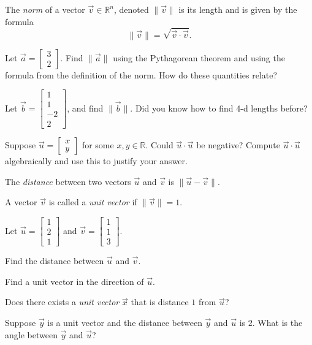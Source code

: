 \documentclass{problemset}
\newcommand{\R}{\mathbb{R}}
\newcommand{\mat}[1]{\begin{bmatrix}#1\end{bmatrix}}
\begin{document}
	\begin{definition}[Norm]
		The \emph{norm} of a vector $\vec v\in\R^n$, denoted $\|\vec v\|$ is its length
		and is given by the formula
		\[
			\|\vec v\| = \sqrt{\vec v\cdot\vec v}.
		\]
	\end{definition}

	\question
	\begin{parts}
		\item Let $\vec a = \mat{3\\2}$.  Find $\|\vec a\|$ using the Pythagorean theorem
			and using the formula from the definition of the norm.  How do
			these quantities relate?
		\item Let $\vec b = \mat{1\\1\\-2\\2}$, and find $\|\vec b\|$.
		Did you know how to find 4-d lengths before?
	
		\item Suppose $\vec u=\mat{x\\ y}$ for some $x,y\in \R$.
		Could $\vec u\cdot \vec u$ be negative? Compute $\vec u\cdot \vec u$ algebraically
		and use this to justify your answer.
	\end{parts}

	\begin{definition}[Distance]
		The \emph{distance} between two vectors $\vec u$ and $\vec v$ is $\|\vec u-\vec v\|$.
	\end{definition}
	\begin{definition}
		A vector $\vec v$ is called a \emph{unit vector} if $\|\vec v\|=1$.
	\end{definition}
	
	\question
	Let $\vec u=\mat{1\\2\\1}$ and $\vec v=\mat{1\\1\\3}$.
	\begin{parts}
		\item Find the distance between $\vec u$ and $\vec v$.
		\item Find a unit vector in the direction of $\vec u$.
		\item Does there exists a \emph{unit vector} $\vec x$ that is distance
			$1$ from $\vec u$?
		\item Suppose $\vec y$ is a unit vector and the distance between $\vec y$ and
			$\vec u$ is $2$.  What is the angle between $\vec y$ and $\vec u$?
	\end{parts}
\end{document}
